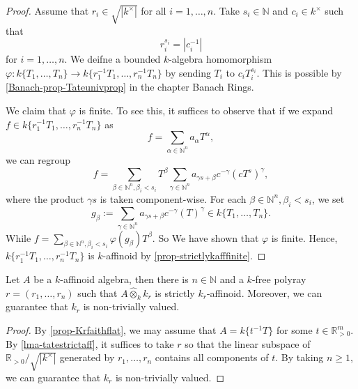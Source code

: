 \begin{proof}
    Assume that $r_i\in \sqrt{|k^{\times}|}$ for all $i=1,\ldots,n$. Take $s_i\in \mathbb{N}$ and $c_i\in k^{\times}$ such that 
    \[
        r_i^{s_i}=|c_i^{-1}|  
    \]
    for $i=1,\ldots,n$. We deifne a bounded $k$-algebra homomorphism $\varphi:k\{T_1,\ldots,T_n\}\rightarrow k\{r_1^{-1}T_1,\ldots,r_n^{-1}T_n\}$ by sending $T_i$ to $c_iT_i^{s_i}$. This is possible by \cref{Banach-prop-Tateunivprop} in the chapter Banach Rings.

    We claim that $\varphi$ is finite. To see this, it suffices to observe that if we expand $f\in k\{r_1^{-1}T_1,\ldots,r_n^{-1}T_n\}$ as
    \[
        f=\sum_{\alpha \in \mathbb{N}^n} a_{\alpha}T^{\alpha},  
    \]
    we can regroup
    \[
        f=\sum_{\beta \in \mathbb{N}^n, \beta_i<s_i} T^{\beta}\sum_{\gamma\in \mathbb{N}^n} a_{\gamma s+\beta}c^{-\gamma} (cT^s)^{\gamma},
    \]
    where the product $\gamma s$ is taken component-wise. For each $\beta \in \mathbb{N}^n, \beta_i<s_i$, we set
    \[
        g_{\beta}:=\sum_{\gamma\in \mathbb{N}^n} a_{\gamma s+\beta}c^{-\gamma} (T)^{\gamma}\in k\{T_1,\ldots,T_n\}.
    \]  
    While $f=\sum_{\beta \in \mathbb{N}^n, \beta_i<s_i} \varphi(g_{\beta})T^{\beta}$. So We have shown that $\varphi$ is finite. Hence, $k\{r_1^{-1}T_1,\ldots,r_n^{-1}T_n\}$ is $k$-affinoid by \cref{prop-strictlykafffinite}.
\end{proof}


\begin{proposition}\label{prop-redtostrictlykaff}
    Let $A$ be a $k$-affinoid algebra, then there is $n\in \mathbb{N}$ and a $k$-free polyray $r=(r_1,\ldots,r_n)$ such that $A\hat{\otimes}_k k_r$ is strictly $k_r$-affinoid. Moreover, we can guarantee that $k_r$ is non-trivially valued.
\end{proposition} 
\begin{proof}
    By \cref{prop-Krfaithflat}, we may assume that $A=k\{t^{-1}T\}$ for some $t\in \mathbb{R}^m_{>0}$. By \cref{lma-tatestrictaff}, it suffices to take $r$ so that the linear subspace of $\mathbb{R}_{>0}/\sqrt{|k^{\times}|}$ generated by $r_1,\ldots,r_n$ contains all components of $t$. By taking $n\geq 1$, we can guarantee that $k_r$ is non-trivially valued.
\end{proof}


